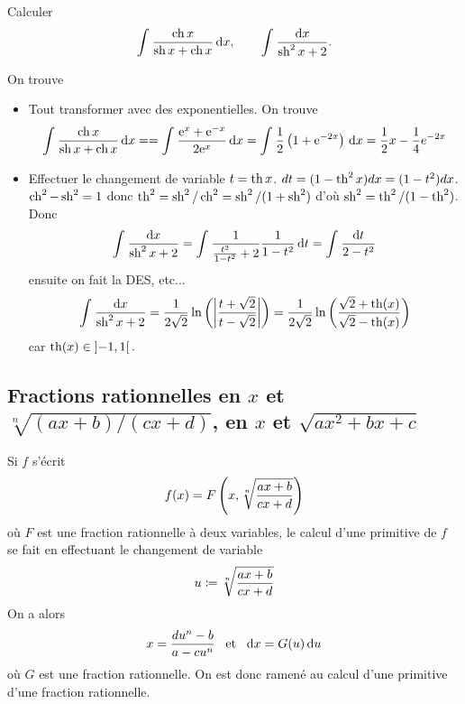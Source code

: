 \documentclass{magnolia}
\begin{document}
\begin{exoUnique}
\exo Calculer
  \[\prim{\frac{\ch x}{\sh x+\ch x}}{x}, \qquad
    \priminv{\sh^2 x+2}{x}.\]
  \begin{sol}
  On trouve
  \begin{itemize}
  \item Tout transformer avec des exponentielles. On trouve
    \[\prim{\frac{\ch x}{\sh x+\ch x}}{x}==\prim{\frac{\e^x+\e^{-x}}{2\e^x}}{x}=\prim{\frac{1}{2}\p{1+\e^{-2x}}}{x}=\frac{1}{2}x
      -\frac{1}{4}e^{-2x}\]
  \item Effectuer le changement de variable $t=\th x$. $dt=(1-\th^2 x)dx=(1-t^2)dx$. $\ch^2-\sh^2=1$ donc $\th^2=\sh^2/\ch^2=\sh^2/(1+\sh^2)$ d'où $\sh^2=\th^2/(1-\th^2)$. Donc 
  $$\priminv{\sh^2 x+2}{x}=\prim{\frac{1}{\frac{t^2}{1-t^2}+2}\frac{1}{1-t^2}}{t}=\priminv{2-t^2}{t}$$ ensuite on fait la DES, etc...
  $$\priminv{\sh^2 x+2}{x}=\frac{1}{2\sqrt{2}}\ln\p{\abs{\frac{t+\sqrt{2}}{t-\sqrt{2}}}}=\frac{1}{2\sqrt{2}}\ln\p{\frac{\sqrt{2}+\th(x)}{\sqrt{2}-\th(x)}}$$ car $\th(x)\in \intero{-1}{1}.$

  \end{itemize}
  \end{sol}
\end{exoUnique}

\subsection{Fractions rationnelles en $x$ et $\sqrt[n]{(ax+b)/(cx+d)}$, en $x$ et $\sqrt{ax^2+bx+c}$}

Si $f$ s'écrit
  \[f(x)=F\p{x,\sqrt[n]{\frac{ax+b}{cx+d}}}\]
  où $F$ est une fraction rationnelle à deux variables, le calcul d'une
  primitive de $f$ se fait en effectuant le changement de variable
  \[u\defeq\sqrt[n]{\frac{ax+b}{cx+d}}\]
  On a alors
  \[x=\frac{du^n-b}{a-cu^n} \et \text{d}x=G(u)\,\text{d}u\]
  où $G$ est une fraction rationnelle. On est donc ramené au calcul d'une
  primitive d'une fraction rationnelle.\\
\end{document}
